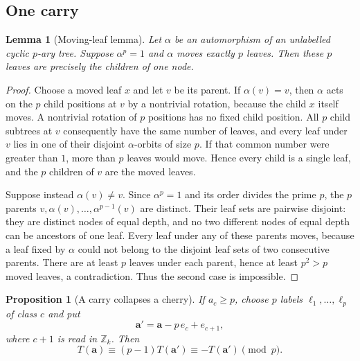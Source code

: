 \documentclass[11pt]{amsart}
\newtheorem{lemma}[theorem]{Lemma}
\newtheorem{proposition}[theorem]{Proposition}
\theoremstyle{definition}
\theoremstyle{remark}
\newcommand{\Z}{\mathbb Z}
\begin{document}
\subsection{One carry}
\begin{lemma}[Moving-leaf lemma]\label{lem:moving-leaves}
Let $\alpha$ be an automorphism of an unlabelled cyclic $p$-ary tree.  Suppose $\alpha^p=1$ and $\alpha$ moves exactly $p$ leaves.  Then these $p$ leaves are precisely the children of one node.
\end{lemma}
\begin{proof}
Choose a moved leaf $x$ and let $v$ be its parent.  If $\alpha(v)=v$, then $\alpha$ acts on the $p$ child positions at $v$ by a nontrivial rotation, because the child $x$ itself moves.  A nontrivial rotation of $p$ positions has no fixed child position.  All $p$ child subtrees at $v$ consequently have the same number of leaves, and every leaf under $v$ lies in one of their disjoint $\alpha$-orbits of size $p$.  If that common number were greater than $1$, more than $p$ leaves would move.  Hence every child is a single leaf, and the $p$ children of $v$ are the moved leaves.

Suppose instead $\alpha(v)\ne v$.  Since $\alpha^p=1$ and its order divides the prime $p$, the $p$ parents $v,\alpha(v),\ldots,\alpha^{p-1}(v)$ are distinct.  Their leaf sets are pairwise disjoint: they are distinct nodes of equal depth, and no two different nodes of equal depth can be ancestors of one leaf.  Every leaf under any of these parents moves, because a leaf fixed by $\alpha$ could not belong to the disjoint leaf sets of two consecutive parents.  There are at least $p$ leaves under each parent, hence at least $p^2>p$ moved leaves, a contradiction.  Thus the second case is impossible.
\end{proof}
\begin{proposition}[A carry collapses a cherry]\label{prop:carry}
If $a_c\ge p$, choose $p$ labels $\ell_1,\ldots,\ell_p$ of class $c$ and put
\[
 \mathbf a'=\mathbf a-p\,e_c+e_{c+1},
\]
where $c+1$ is read in $\Z_k$.  Then
\[
 T(\mathbf a)\equiv(p-1)T(\mathbf a')
 \equiv-T(\mathbf a')\pmod p.
\]
\end{proposition}
\end{document}
